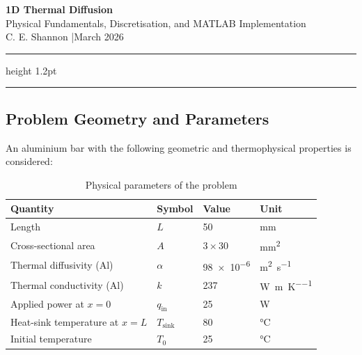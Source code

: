 \documentclass[11pt, a4paper]{scrartcl}
\begin{document}
\begin{center}
  {\LARGE\bfseries\color{myblue} 1D Thermal Diffusion}\\[6pt]
  {\large Physical Fundamentals, Discretisation, and MATLAB Implementation}\\[8pt]
  {\normalsize C. E. Shannon \quad|\quad March 2026}
\end{center}

\vspace{0.5em}
\hrule height 1.2pt
\vspace{1.5em}

\tableofcontents

\vspace{1.5em}
\hrule
\newpage
\begin{onehalfspace}
\section{Problem Geometry and Parameters}

An aluminium bar with the following geometric and thermophysical properties is considered:

\begin{table}[h!]
\centering
\caption{Physical parameters of the problem}
\begin{tabular}{llll}
\toprule
\textbf{Quantity} & \textbf{Symbol} & \textbf{Value} & \textbf{Unit} \\
\midrule
Length                        & $L$             & \num{50}            & \si{\milli\meter} \\
Cross-sectional area          & $A$             & $\num{3} \times \num{30}$ & \si{\milli\meter\squared} \\
Thermal diffusivity (Al)      & $\alpha$        & \num{98e-6}         & \si{\meter\squared\per\second} \\
Thermal conductivity (Al)     & $k$             & \num{237}           & \si{\watt\per\meter\per\kelvin} \\
Applied power at $x=0$        & $q_\text{in}$   & \num{25}            & \si{\watt} \\
Heat-sink temperature at $x=L$& $T_\text{sink}$ & \num{80}            & \si{\celsius} \\
Initial temperature           & $T_0$           & \num{25}            & \si{\celsius} \\
\bottomrule
\end{tabular}
\end{table}


\end{onehalfspace}
\end{document}
